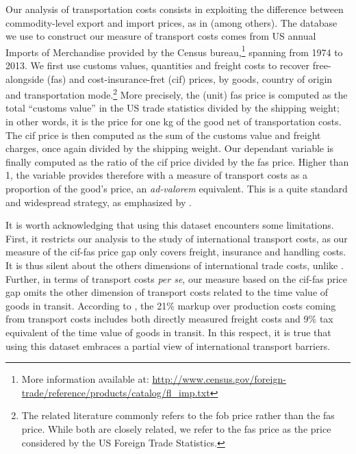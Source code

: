 \documentclass[a4paper,11pt]{article}
\begin{document}
Our analysis of transportation costs consists in exploiting the difference between commodity-level export and import prices, as in \cite{hummels2007} (among others). The database we use to construct our measure of transport costs comes from US annual Imports of Merchandise provided by the Census bureau,\footnote{More information available at: \url{http://www.census.gov/foreign-trade/reference/products/catalog/fl_imp.txt}} spanning from 1974 to 2013. We first use customs values, quantities and freight costs to recover free-alongside (fas) and cost-insurance-fret (cif) prices, by goods, country of origin and transportation mode.\footnote{The related literature commonly refers to the fob price rather than the fas price. While both are closely related, we refer to the fas price as the price considered by the US Foreign Trade Statistics.} More precisely, the (unit) fas price is computed as the total ``customs value'' in the US trade statistics divided by the shipping weight; in other words, it is the price for one kg of the good net of transportation costs. The cif price is then computed as the sum of the customs value and freight charges, once again divided by the shipping weight. Our dependant variable is finally computed as the ratio of the cif price divided by the fas price. Higher than 1, the variable provides therefore with a measure of transport costs as a proportion of the good's price, an \emph{ad-valorem} equivalent. This is a quite standard and widespread strategy, as emphasized by \citet{anderson_wincoop_jel}.

It is worth acknowledging that using this dataset encounters some limitations. First, it restricts our analysis to the study of international transport costs, as our measure of the cif-fas price gap only covers freight, insurance and handling costs. It is thus silent about the others dimensions of international trade costs, unlike \citet{Irrazabal_2015}. Further, in terms of transport costs \textit{per se}, our measure based on the cif-fas price gap omits the other dimension of transport costs related to the time value of goods in transit. According to \citet{anderson_wincoop_jel}, the 21\% markup over production costs coming from transport costs includes both directly measured freight costs and 9\% tax equivalent of the time value of goods in transit. In this respect, it is true that using this dataset embraces a partial view of international transport barriers.
\end{document}
